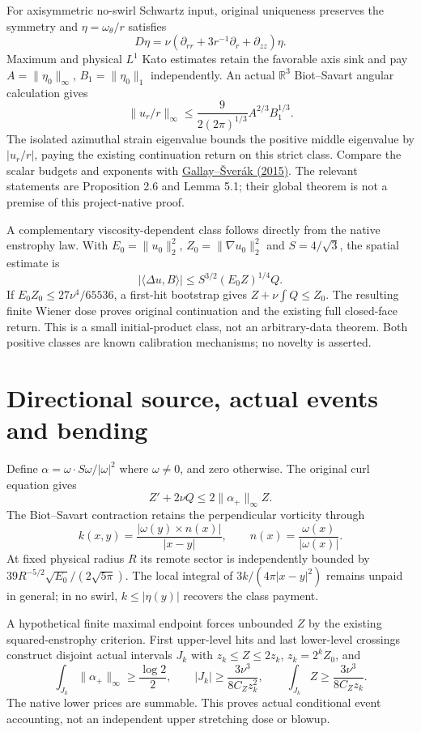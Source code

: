 \documentclass[11pt]{article}
\begin{document}
For axisymmetric no-swirl Schwartz input, original uniqueness preserves
the symmetry and $\eta=\omega_\theta/r$ satisfies
\[
 D\eta=\nu(\partial_{rr}+3r^{-1}\partial_r+\partial_{zz})\eta.
\]
Maximum and physical $L^1$ Kato estimates retain the favorable axis sink
and pay $A=\|\eta_0\|_\infty$, $B_1=\|\eta_0\|_1$ independently.
An actual $\mathbb R^3$ Biot--Savart angular calculation gives
\[
 \|u_r/r\|_\infty\le
 \frac9{2(2\pi)^{1/3}}A^{2/3}B_1^{1/3}.
\]
The isolated azimuthal strain eigenvalue bounds the positive middle
eigenvalue by $|u_r/r|$, paying the existing continuation return on this
strict class. Compare the scalar budgets and exponents with
\href{https://cml.centre-mersenne.org/item/10.5802/cml.25.pdf}{Gallay--\v{S}ver\'ak (2015)}.
The relevant statements are Proposition 2.6 and Lemma 5.1; their global
theorem is not a premise of this project-native proof.

A complementary viscosity-dependent class follows directly from the
native enstrophy law. With $E_0=\|u_0\|_2^2$, $Z_0=\|\nabla u_0\|_2^2$
and $S=4/\sqrt3$, the spatial estimate is
\[
 |\langle\Delta u,B\rangle|
 \le S^{3/2}(E_0Z)^{1/4}Q.
\]
If $E_0Z_0\le27\nu^4/65536$, a first-hit bootstrap gives
$Z+\nu\int Q\le Z_0$. The resulting finite Wiener dose proves original
continuation and the existing full closed-face return. This is a small
initial-product class, not an arbitrary-data theorem. Both positive
classes are known calibration mechanisms; no novelty is asserted.

\section{Directional source, actual events and bending}
Define $\alpha=\omega\cdot S\omega/|\omega|^2$ where $\omega\ne0$,
and zero otherwise. The original curl equation gives
\[
 Z'+2\nu Q\le2\|\alpha_+\|_\infty Z.
\]
The Biot--Savart contraction retains the perpendicular vorticity through
\[
 k(x,y)=\frac{|\omega(y)\times n(x)|}{|x-y|},
 \qquad n(x)=\frac{\omega(x)}{|\omega(x)|}.
\]
At fixed physical radius $R$ its remote sector is independently bounded by
$39R^{-5/2}\sqrt{E_0}/(2\sqrt{5\pi})$.
The local integral of $3k/(4\pi|x-y|^2)$ remains unpaid in general;
in no swirl, $k\le|\eta(y)|$ recovers the class payment.

A hypothetical finite maximal endpoint forces unbounded $Z$ by the
existing squared-enstrophy criterion. First upper-level hits and last
lower-level crossings construct disjoint actual intervals $J_k$ with
$z_k\le Z\le2z_k$, $z_k=2^kZ_0$, and
\[
 \int_{J_k}\|\alpha_+\|_\infty\ge\frac{\log2}2,
 \qquad |J_k|\ge\frac{3\nu^3}{8C_Zz_k^2},
 \qquad \int_{J_k}Z\ge\frac{3\nu^3}{8C_Zz_k}.
\]
The native lower prices are summable. This proves actual conditional
event accounting, not an independent upper stretching dose or blowup.
\end{document}
